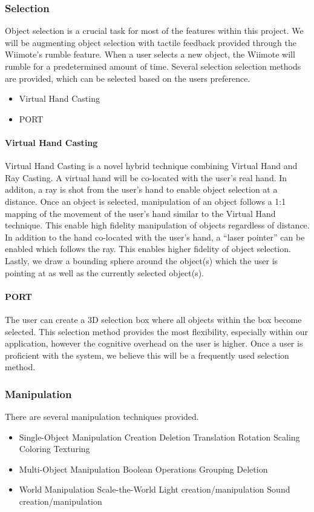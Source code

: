 \subsubsection{Selection}
\label{Design:Interaction:Selection}
Object selection is a crucial task for most of the features within this project.
We will be augmenting object selection with tactile feedback provided through the Wiimote's rumble feature.
When a user selects a new object, the Wiimote will rumble for a predetermined amount of time.
Several selection selection methods are provided, which can be selected based on the users preference.
\begin{itemize}
	\item Virtual Hand Casting
	\item PORT
\end{itemize}

\paragraph{Virtual Hand Casting}
Virtual Hand Casting is a novel hybrid technique combining Virtual Hand and Ray Casting.
A virtual hand will be co-located with the user's real hand.
In additon, a ray is shot from the user's hand to enable object selection at a distance.
Once an object is selected, manipulation of an object follows a 1:1 mapping of the movement of the user's hand similar to the Virtual Hand technique.
This enable high fidelity manipulation of objects regardless of distance.
In addition to the hand co-located with the user's hand, a ``laser pointer'' can be enabled which follows the ray.
This enables higher fidelity of object selection.
Lastly, we draw a bounding sphere around the object(s) which the user is pointing at as well as the currently selected object(s).

\paragraph{PORT}
The user can create a 3D selection box where all objects within the box become selected.
This selection method provides the most flexibility, especially within our application, however the cognitive overhead on the user is  higher.
Once a user is proficient with the system, we believe this will be a frequently used selection method.

\subsubsection{Manipulation}
\label{Design:Interaction:Manipulation}
There are several manipulation techniques provided.
\begin{itemize}
	\item Single-Object Manipulation
		\subitem Creation
		\subitem Deletion
		\subitem Translation
		\subitem Rotation
		\subitem Scaling
		\subitem Coloring
		\subitem Texturing
	\item Multi-Object Manipulation
		\subitem Boolean Operations
		\subitem Grouping
		\subitem Deletion
	\item World Manipulation
		\subitem Scale-the-World
		\subitem Light creation/manipulation
		\subitem Sound creation/manipulation
\end{itemize}


